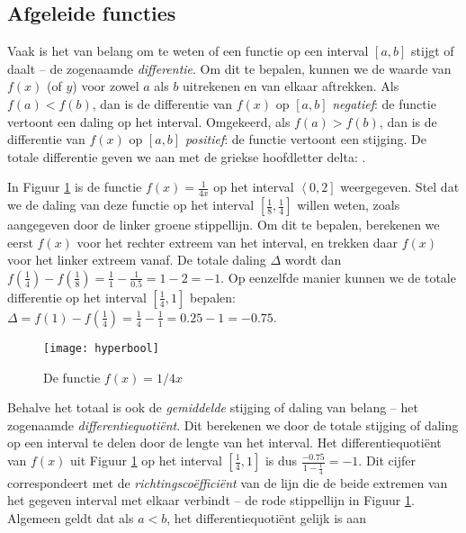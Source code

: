 \subsection{Afgeleide functies}

Vaak is het van belang om te weten of een functie op een interval $\left[a,b\right]$ stijgt of daalt – de zogenaamde \textit{differentie}. Om dit te bepalen, kunnen we de waarde van $f(x)$ (of $y$) voor zowel $a$ als $b$ uitrekenen en van elkaar aftrekken. Als $f(a) < f(b)$, dan is de differentie van $f(x)$ op $\left[a,b\right]$ \textit{negatief}: de functie vertoont een daling op het interval. Omgekeerd, als $f(a) > f(b)$, dan is de differentie van $f(x)$ op $\left[a,b\right]$ \textit{positief}: de functie vertoont een stijging. De totale differentie geven we aan met de griekse hoofdletter delta: \Delta.

In Figuur \ref{img:hyperbool} is de functie $f(x) = \frac{1}{4x}$ op het interval $\left<0,2\right]$ weergegeven. Stel dat we de daling van deze functie op het interval $\left[\frac{1}{8}, \frac{1}{4}\right]$ willen weten, zoals aangegeven door de linker groene stippellijn. Om dit te bepalen, berekenen we eerst $f(x)$ voor het rechter extreem van het interval, en trekken daar $f(x)$ voor het linker extreem vanaf. De totale daling $\Delta$ wordt dan $f(\frac{1}{4}) - f(\frac{1}{8}) = \frac{1}{1} - \frac{1}{0.5} = 1 - 2 = -1$. Op eenzelfde manier kunnen we de totale differentie op het interval $\left[\frac{1}{4},1\right]$ bepalen: $\Delta = f(1) - f(\frac{1}{4})  = \frac{1}{4} - \frac{1}{1} = 0.25 - 1 = -0.75$.

\begin{figure}[h]
    \centering
    \texttt{[image: hyperbool]}
    \caption{De functie $f(x) = 1/4x$\label{img:hyperbool}}
\end{figure}
    
Behalve het totaal is ook de \textit{gemiddelde} stijging of daling van belang – het zogenaamde \textit{differentiequotiënt}. Dit berekenen we door de totale stijging of daling op een interval te delen door de lengte van het interval. Het differentiequotiënt van $f(x)$ uit Figuur \ref{img:hyperbool} op het interval $\left[\frac{1}{4},1\right]$ is dus $\frac{-0.75}{1-\frac{1}{4}} = -1$. Dit cijfer correspondeert met de \textit{richtingscoëfficiënt} van de lijn die de beide extremen van het gegeven interval met elkaar verbindt – de rode stippellijn in Figuur \ref{img:hyperbool}. Algemeen geldt dat als $a<b$, het differentiequotiënt gelijk is aan

